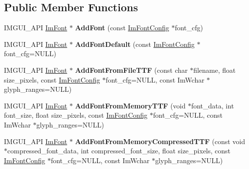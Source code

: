 \subsection*{Public Member Functions}
\begin{DoxyCompactItemize}
\item 
\mbox{\label{struct_im_font_atlas_ad01c0f19a95d37a9e5ebab1e54525625}} 
I\+M\+G\+U\+I\+\_\+\+A\+PI \hyperlink{struct_im_font}{Im\+Font} $\ast$ {\bfseries Add\+Font} (const \hyperlink{struct_im_font_config}{Im\+Font\+Config} $\ast$font\+\_\+cfg)
\item 
\mbox{\label{struct_im_font_atlas_a9d2b4a94579bf603a0d2662cd8348cbd}} 
I\+M\+G\+U\+I\+\_\+\+A\+PI \hyperlink{struct_im_font}{Im\+Font} $\ast$ {\bfseries Add\+Font\+Default} (const \hyperlink{struct_im_font_config}{Im\+Font\+Config} $\ast$font\+\_\+cfg=N\+U\+LL)
\item 
\mbox{\label{struct_im_font_atlas_a26d0333bae95222ca2c2fd2886eae562}} 
I\+M\+G\+U\+I\+\_\+\+A\+PI \hyperlink{struct_im_font}{Im\+Font} $\ast$ {\bfseries Add\+Font\+From\+File\+T\+TF} (const char $\ast$filename, float size\+\_\+pixels, const \hyperlink{struct_im_font_config}{Im\+Font\+Config} $\ast$font\+\_\+cfg=N\+U\+LL, const Im\+Wchar $\ast$glyph\+\_\+ranges=N\+U\+LL)
\item 
\mbox{\label{struct_im_font_atlas_adb01397920998a18e25bd8fed3f791a7}} 
I\+M\+G\+U\+I\+\_\+\+A\+PI \hyperlink{struct_im_font}{Im\+Font} $\ast$ {\bfseries Add\+Font\+From\+Memory\+T\+TF} (void $\ast$font\+\_\+data, int font\+\_\+size, float size\+\_\+pixels, const \hyperlink{struct_im_font_config}{Im\+Font\+Config} $\ast$font\+\_\+cfg=N\+U\+LL, const Im\+Wchar $\ast$glyph\+\_\+ranges=N\+U\+LL)
\item 
\mbox{\label{struct_im_font_atlas_a579bb434bd116ea9ac4f892652ccefdb}} 
I\+M\+G\+U\+I\+\_\+\+A\+PI \hyperlink{struct_im_font}{Im\+Font} $\ast$ {\bfseries Add\+Font\+From\+Memory\+Compressed\+T\+TF} (const void $\ast$compressed\+\_\+font\+\_\+data, int compressed\+\_\+font\+\_\+size, float size\+\_\+pixels, const \hyperlink{struct_im_font_config}{Im\+Font\+Config} $\ast$font\+\_\+cfg=N\+U\+LL, const Im\+Wchar $\ast$glyph\+\_\+ranges=N\+U\+LL)
\item 

\end{DoxyCompactItemize}
